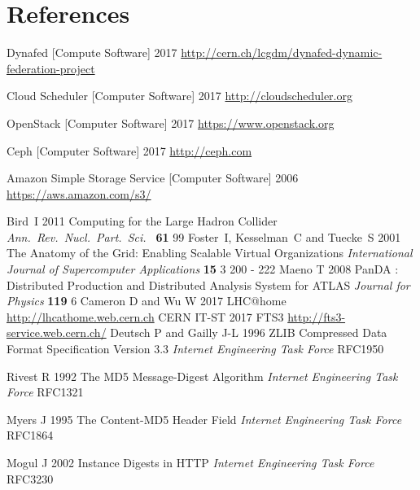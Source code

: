 \documentclass[a4paper]{jpconf}
\begin{document}
\section*{References}
\begin{thebibliography}{9}
  Dynafed [Compute Software]
  2017
  \url{http://cern.ch/lcgdm/dynafed-dynamic-federation-project}

  Cloud Scheduler [Computer Software]
  2017
  \url{http://cloudscheduler.org}

  OpenStack [Computer Software]
  2017
  \url{https://www.openstack.org}

  Ceph [Computer Software]
  2017
  \url{http://ceph.com}

  Amazon Simple Storage Service [Computer Software]
  2006
  \url{https://aws.amazon.com/s3/}

  Bird~I
  2011
  Computing for the Large Hadron Collider
  {\it Ann.\ Rev.\ Nucl.\ Part.\ Sci.\ } {\bf 61} 99
  Foster~I, Kesselman~C and Tuecke~S
  2001
  The Anatomy of the Grid: Enabling Scalable Virtual Organizations
  {\it International Journal of Supercomputer Applications} {\bf 15} 3 200 - 222
  Maeno T
  2008
  PanDA : Distributed Production and Distributed Analysis System for ATLAS
  {\it Journal for Physics} {\bf 119} 6
  Cameron D and Wu W
  2017
  LHC@home
  \url{http://lhcathome.web.cern.ch}
  CERN IT-ST
  2017
  FTS3
  \url{http://fts3-service.web.cern.ch/}
  Deutsch P and Gailly J-L
  1996
  ZLIB Compressed Data Format Specification Version 3.3
  {\it  Internet Engineering Task Force} RFC1950
  
  Rivest R
  1992
  The MD5 Message-Digest Algorithm
  {\it  Internet Engineering Task Force} RFC1321

  Myers J
  1995
  The Content-MD5 Header Field
  {\it  Internet Engineering Task Force} RFC1864

  Mogul J
  2002
  Instance Digests in HTTP
  {\it  Internet Engineering Task Force} RFC3230

\end{thebibliography}
\end{document}
